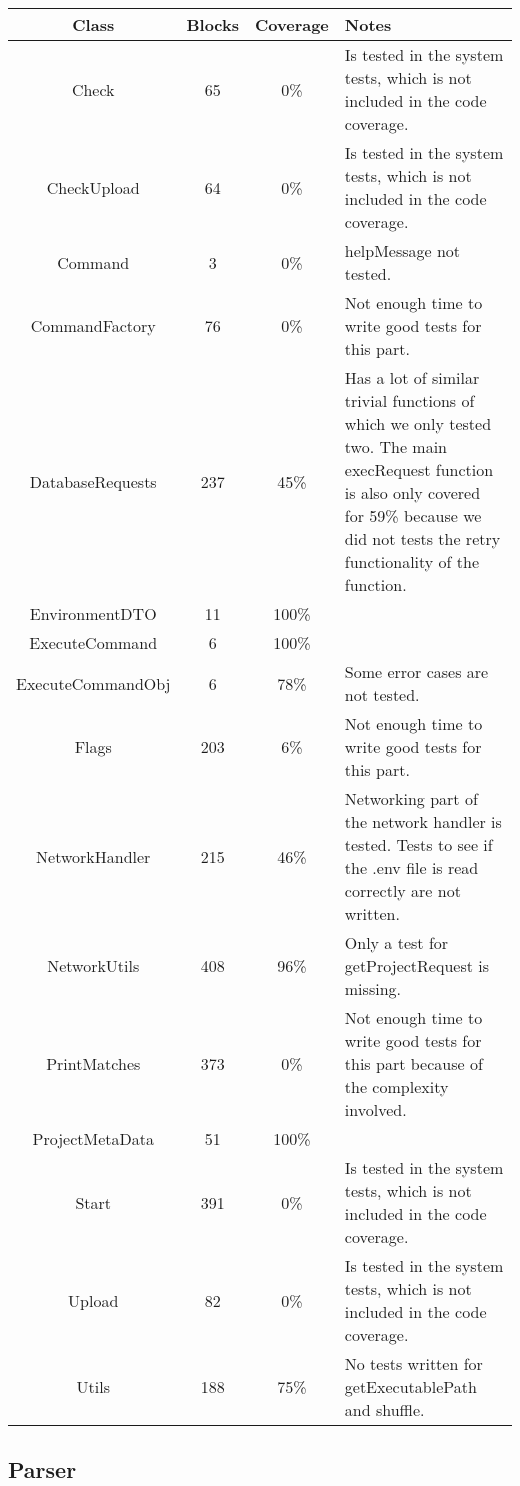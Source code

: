 \documentclass[./Main.tex]{subfiles}
\begin{document}
\begin{tabular}{c|c|c|p{8cm}}
     Class & Blocks & Coverage & Notes \\
     \hline
     Check & 65 & 0\% & Is tested in the system tests, which is not included in the code coverage.\\
     CheckUpload & 64 & 0\% & Is tested in the system tests, which is not included in the code coverage.\\
     Command & 3 & 0\% & helpMessage not tested.\\
     CommandFactory & 76 & 0\% & Not enough time to write good tests for this part.\\
     DatabaseRequests & 237 & 45\% & Has a lot of similar trivial functions of which we only tested two. The main execRequest function is also only covered for 59\% because we did not tests the retry functionality of the function.\\
     EnvironmentDTO & 11 & 100\% & \\
     ExecuteCommand & 6 & 100\% & \\
     ExecuteCommandObj & 6 & 78\% & Some error cases are not tested.\\
     Flags & 203 & 6\% & Not enough time to write good tests for this part. \\
     NetworkHandler & 215 & 46\% & Networking part of the network handler is tested. Tests to see if the .env file is read correctly are not written. \\
     NetworkUtils & 408 & 96\% & Only a test for getProjectRequest is missing.\\
     PrintMatches & 373 & 0\% & Not enough time to write good tests for this part because of the complexity involved.\\
     ProjectMetaData & 51 & 100\% & \\
     Start & 391 & 0\% & Is tested in the system tests, which is not included in the code coverage.\\
     Upload & 82 & 0\% & Is tested in the system tests, which is not included in the code coverage.\\
     Utils & 188 & 75\% & No tests written for getExecutablePath and shuffle.\\
     
     
\end{tabular}


\tocless\subsection{Parser}
\end{document}
